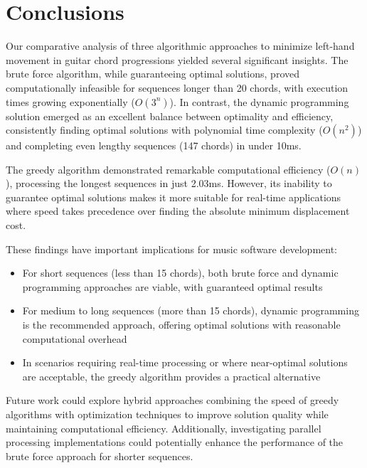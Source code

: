 \documentclass[lettersize,journal]{IEEEtran}
\begin{document}
\section{Conclusions}
\noindent Our comparative analysis of three algorithmic approaches to minimize left-hand movement in guitar chord progressions yielded several significant insights. The brute force algorithm, while guaranteeing optimal solutions, proved computationally infeasible for sequences longer than 20 chords, with execution times growing exponentially ($O(3^n)$). In contrast, the dynamic programming solution emerged as an excellent balance between optimality and efficiency, consistently finding optimal solutions with polynomial time complexity ($O(n^2)$) and completing even lengthy sequences (147 chords) in under 10ms.

The greedy algorithm demonstrated remarkable computational efficiency ($O(n)$), processing the longest sequences in just 2.03ms. However, its inability to guarantee optimal solutions makes it more suitable for real-time applications where speed takes precedence over finding the absolute minimum displacement cost.

These findings have important implications for music software development:
\begin{itemize}
    \item For short sequences (less than 15 chords), both brute force and dynamic programming approaches are viable, with guaranteed optimal results
    \item For medium to long sequences (more than 15 chords), dynamic programming is the recommended approach, offering optimal solutions with reasonable computational overhead
    \item In scenarios requiring real-time processing or where near-optimal solutions are acceptable, the greedy algorithm provides a practical alternative
\end{itemize}

Future work could explore hybrid approaches combining the speed of greedy algorithms with optimization techniques to improve solution quality while maintaining computational efficiency. Additionally, investigating parallel processing implementations could potentially enhance the performance of the brute force approach for shorter sequences.
\end{document}
